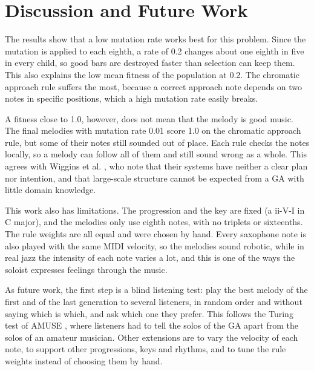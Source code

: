 \section{Discussion and Future Work}\label{sec:discussion}

The results show that a low mutation rate works best for this problem. Since the mutation is applied to each eighth, a rate of 0.2 changes about one eighth in five in every child, so good bars are destroyed faster than selection can keep them. This also explains the low mean fitness of the population at 0.2. The chromatic approach rule suffers the most, because a correct approach note depends on two notes in specific positions, which a high mutation rate easily breaks.

A fitness close to 1.0, however, does not mean that the melody is good music. The final melodies with mutation rate 0.01 score 1.0 on the chromatic approach rule, but some of their notes still sounded out of place. Each rule checks the notes locally, so a melody can follow all of them and still sound wrong as a whole. This agrees with Wiggins et al. \cite{wiggins1998}, who note that their systems have neither a clear plan nor intention, and that large-scale structure cannot be expected from a GA with little domain knowledge.

This work also has limitations. The progression and the key are fixed (a ii-V-I in C major), and the melodies only use eighth notes, with no triplets or sixteenths. The rule weights are all equal and were chosen by hand. Every saxophone note is also played with the same MIDI velocity, so the melodies sound robotic, while in real jazz the intensity of each note varies a lot, and this is one of the ways the soloist expresses feelings through the music.

As future work, the first step is a blind listening test: play the best melody of the first and of the last generation to several listeners, in random order and without saying which is which, and ask which one they prefer. This follows the Turing test of AMUSE \cite{ozcan2008}, where listeners had to tell the solos of the GA apart from the solos of an amateur musician. Other extensions are to vary the velocity of each note, to support other progressions, keys and rhythms, and to tune the rule weights instead of choosing them by hand.

